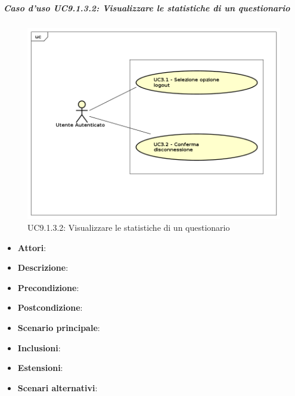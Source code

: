				\subparagraph{Caso d'uso UC9.1.3.2: Visualizzare le statistiche di un questionario}
				\label{UC9.1.3.2}
				\begin{figure}[h]
					\centering
					\includegraphics[scale=0.7,keepaspectratio]{UML/UC9.png}
					\caption{UC9.1.3.2: Visualizzare le statistiche di un questionario}
				\end{figure}
				\FloatBarrier
				\begin{itemize}
					\item \textbf{Attori}: 
					\item \textbf{Descrizione}: 
					\item \textbf{Precondizione}: 
					\item \textbf{Postcondizione}: 
					\item \textbf{Scenario principale}:
					\item \textbf{Inclusioni}:
					\item \textbf{Estensioni}:
					\item \textbf{Scenari alternativi}:
				\end{itemize}
				
